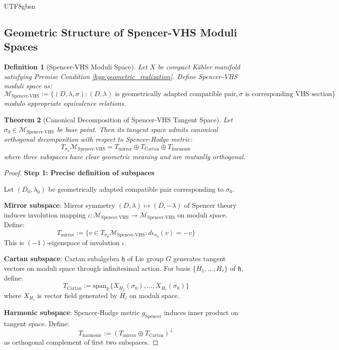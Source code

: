 \documentclass[a4paper,12pt]{extarticle}
\newtheorem{theorem}{Theorem}[section]
\newtheorem{definition}[theorem]{Definition}
\theoremstyle{definition}
\begin{document}
\begin{CJK}{UTF8}{gbsn}
\subsection{Geometric Structure of Spencer-VHS Moduli Spaces}

\begin{definition}[Spencer-VHS Moduli Space]
\label{def:spencer_vhs_moduli}
Let $X$ be compact Kähler manifold satisfying Premise Condition \ref{hyp:geometric_realization}. Define Spencer-VHS moduli space as:
$$\mathcal{M}_{\text{Spencer-VHS}} := \{(D, \lambda, \sigma) : (D, \lambda) \text{ is geometrically adapted compatible pair}, \sigma \text{ is corresponding VHS section}\}$$
modulo appropriate equivalence relations.
\end{definition}

\begin{theorem}[Canonical Decomposition of Spencer-VHS Tangent Space]
\label{thm:spencer_vhs_tangent_decomposition}
Let $\sigma_0 \in \mathcal{M}_{\text{Spencer-VHS}}$ be base point. Then its tangent space admits canonical orthogonal decomposition with respect to Spencer-Hodge metric:
$$T_{\sigma_0} \mathcal{M}_{\text{Spencer-VHS}} = T_{\text{mirror}} \oplus T_{\text{Cartan}} \oplus T_{\text{harmonic}}$$
where three subspaces have clear geometric meaning and are mutually orthogonal.
\end{theorem}

\begin{proof}
\textbf{Step 1: Precise definition of subspaces}

Let $(D_0, \lambda_0)$ be geometrically adapted compatible pair corresponding to $\sigma_0$.

\textbf{Mirror subspace}: Mirror symmetry $(D, \lambda) \mapsto (D, -\lambda)$ of Spencer theory induces involution mapping $\iota: \mathcal{M}_{\text{Spencer-VHS}} \to \mathcal{M}_{\text{Spencer-VHS}}$ on moduli space. Define:
$$T_{\text{mirror}} := \{v \in T_{\sigma_0} \mathcal{M}_{\text{Spencer-VHS}} : d\iota_{\sigma_0}(v) = -v\}$$
This is $(-1)$-eigenspace of involution $\iota$.

\textbf{Cartan subspace}: Cartan subalgebra $\mathfrak{h}$ of Lie group $G$ generates tangent vectors on moduli space through infinitesimal action. For basis $\{H_1, \ldots, H_r\}$ of $\mathfrak{h}$, define:
$$T_{\text{Cartan}} := \text{span}_{\mathbb{R}}\{X_{H_1}(\sigma_0), \ldots, X_{H_r}(\sigma_0)\}$$
where $X_{H_i}$ is vector field generated by $H_i$ on moduli space.

\textbf{Harmonic subspace}: Spencer-Hodge metric $g_{\text{Spencer}}$ induces inner product on tangent space. Define:
$$T_{\text{harmonic}} := (T_{\text{mirror}} \oplus T_{\text{Cartan}})^{\perp}$$
as orthogonal complement of first two subspaces.


\end{proof}
\end{CJK}
\end{document}
